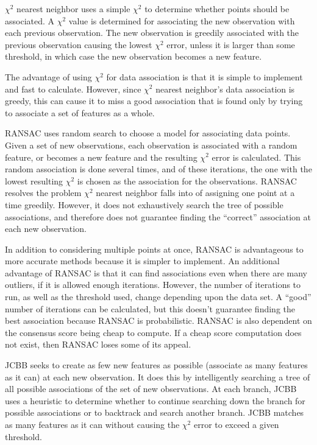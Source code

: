 \documentclass[12pt]{article}
\begin{document}
	$\chi^2$ nearest neighbor uses a simple $\chi^2$ to determine whether points
should be associated.  A $\chi^2$ value is determined for associating the new observation
with each previous observation.  The new observation is greedily associated with the previous
observation causing the lowest $\chi^2$ error, unless it is larger than some threshold,
in which case the new observation becomes a new feature.

	The advantage of using $\chi^2$ for data association is that it is simple to implement
and fast to calculate.  However, since $\chi^2$ nearest neighbor's data association is greedy, this can
cause it to miss a good association that is found only by trying to associate a set of features
as a whole.

	RANSAC uses random search to choose a model for associating data points.  Given
a set of new observations, each observation is associated with a random feature, or
becomes a new feature and the resulting $\chi^2$ error is calculated.  This random
association is done several times, and of these iterations, the one with the lowest
resulting $\chi^2$ is chosen as the association for the observations.  RANSAC resolves
the problem $\chi^2$ nearest neighbor falls into of assigning one point at a time greedily.
However, it does not exhaustively search the tree of possible associations, and therefore
does not guarantee finding the ``correct'' association at each new observation.

	In addition to considering multiple points at once, RANSAC is advantageous to more
accurate methods because it is simpler to implement.  An additional advantage of RANSAC
is that it can find associations even when there are many outliers, if it is allowed enough
iterations.  However, the number of iterations to run, as well as the threshold used, change
depending upon the data set.  A ``good'' number of iterations can be calculated, but this doesn't
guarantee finding the best association because RANSAC is probabilistic. RANSAC is also dependent
on the consensus score being cheap to compute. If a cheap score computation does not exist, then
RANSAC loses some of its appeal.

	JCBB seeks to create as few new features as possible (associate as many features
as it can) at each new observation.  It does this by intelligently searching a tree of all
possible associations of the set of new observations.  At each branch, JCBB uses a
heuristic to determine whether to continue searching down the branch for possible
associations or to backtrack and search another branch.  JCBB matches as many features
as it can without causing the $\chi^2$ error to exceed a given threshold.
\end{document}

